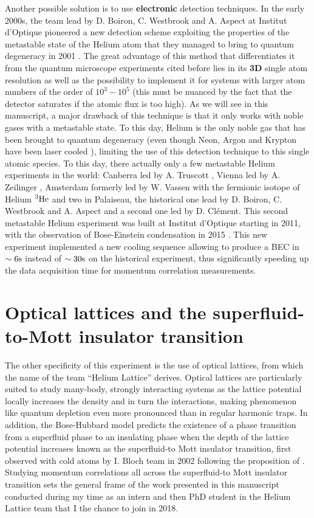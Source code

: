 Another possible solution is to use \textbf{electronic} detection techniques. In the early 2000s, the team lead by D. Boiron, C. Westbrook and A. Aspect at Institut d'Optique pioneered a new detection scheme exploiting the properties of the metastable state of the Helium atom that they managed to bring to quantum degeneracy in 2001 \cite{robert2001bose}. The great advantage of this method that differentiates it from the quantum microscope experiments cited before lies in its \textbf{3D} single atom resolution as well as the possibility to implement it for systems with larger atom numbers of the order of $10^3-10^5$ (this must be nuanced by the fact that the detector saturates if the atomic flux is too high). As we will see in this manuscript, a major drawback of this technique is that it only works with noble gases with a metastable state. To this day, Helium is the only noble gas that has been brought to quantum degeneracy (even though Neon, Argon and Krypton have been laser cooled \cite{shimizu1989laser,katori1990laser}), limiting the use of this detection technique to this single atomic species. To this day, there actually only a few metastable Helium experiments in the world: Canberra led by A. Truscott \cite{abbas2021rapid}, Vienna led by A. Zeilinger \cite{keller2014bose}, Amsterdam formerly led by W. Vassen \cite{mcnamara2006degenerate} with the fermionic isotope of Helium $^3 \rm{He}$ and two in Palaiseau, the historical one lead by D. Boiron, C. Westbrook and A. Aspect and a second one led by D. Clément. This second metastable Helium experiment was built at Institut d'Optique starting in 2011, with the observation of Bose-Einstein condensation in 2015 \cite{bouton2015fast}. This new experiment implemented a new cooling sequence allowing to produce a BEC in $\sim 6\rm{s}$ instead of $\sim 30\rm{s}$ on the historical experiment, thus significantly speeding up the data acquisition time for momentum correlation measurements.

\section*{Optical lattices and the superfluid-to-Mott insulator transition}

The other specificity of this experiment is the use of optical lattices, from which the name of the team ``Helium Lattice'' derives. Optical lattices are particularly suited to study many-body, strongly interacting systems as the lattice potential locally increases the density and in turn the interactions, making phenomenon like quantum depletion even more pronounced than in regular harmonic traps. In addition, the Bose-Hubbard model predicts the existence of a phase transition from a superfluid phase to an insulating phase when the depth of the lattice potential increases known as the superfluid-to Mott insulator transition, first observed with cold atoms by I. Bloch team in 2002 \cite{greiner2002quantum} following the proposition of \cite{jaksch1998cold}. Studying momentum correlations all across the superfluid-to Mott insulator transition sets the general frame of the work presented in this manuscript conducted during my time as an intern and then PhD student in the Helium Lattice team that I the chance to join in 2018.

